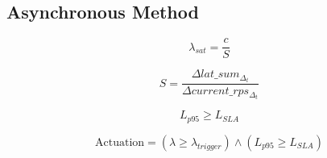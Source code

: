 \documentclass{article}
\begin{document}
\subsection{Asynchronous Method}

$$\lambda_{sat} = \frac{c}{S}$$

$$S = \frac{\Delta lat\_sum_{\Delta_t}}{\Delta current\_rps_{\Delta_t}}$$



$$L_{p95} \geq L_{SLA}$$

$$\text{Actuation} = (\lambda \geq \lambda_{trigger}) \land (L_{p95} \geq L_{SLA})$$
\end{document}
